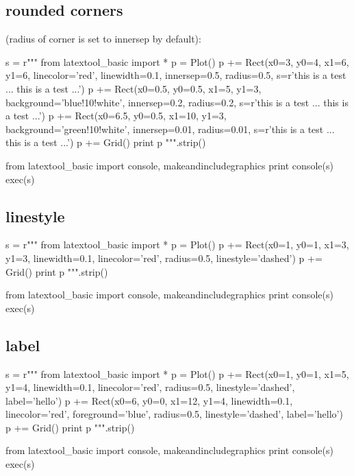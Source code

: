 \newpage
\subsection{rounded corners}
(radius of corner is set to innersep by default):
\begin{python}
s = r"""
from latextool_basic import *
p = Plot()
p += Rect(x0=3, y0=4, x1=6, y1=6, linecolor='red', linewidth=0.1,
          innersep=0.5, radius=0.5, 
          s=r'{\tiny this is a test ... this is a test ...}')
p += Rect(x0=0.5, y0=0.5, x1=5, y1=3, 
          background='blue!10!white', 
          innersep=0.2, radius=0.2,
          s=r'{\tiny this is a test ... this is a test ...}')
p += Rect(x0=6.5, y0=0.5, x1=10, y1=3, 
          background='green!10!white', 
          innersep=0.01, radius=0.01,
          s=r'{\tiny this is a test ... this is a test ...}')
p += Grid()
print p
""".strip()

from latextool_basic import console, makeandincludegraphics
print console(s)
exec(s)
\end{python}


\newpage
\subsection{linestyle}
\begin{python}
s = r"""
from latextool_basic import *
p = Plot()
p += Rect(x0=1, y0=1, x1=3, y1=3,
          linewidth=0.1, linecolor='red',
          radius=0.5, linestyle='dashed')
p += Grid()
print p
""".strip()

from latextool_basic import console, makeandincludegraphics
print console(s)
exec(s)
\end{python}


\newpage
\subsection{label}
\begin{python}
s = r"""
from latextool_basic import *
p = Plot()
p += Rect(x0=1, y0=1, x1=5, y1=4,
          linewidth=0.1, linecolor='red',
          radius=0.5, linestyle='dashed', label='hello')
p += Rect(x0=6, y0=0, x1=12, y1=4,
          linewidth=0.1, linecolor='red',
          foreground='blue',
          radius=0.5, linestyle='dashed', label='hello')
p += Grid()
print p
""".strip()

from latextool_basic import console, makeandincludegraphics
print console(s)
exec(s)
\end{python}



